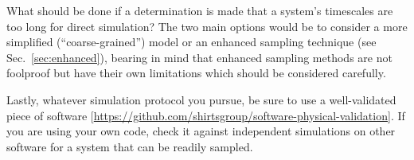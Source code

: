 What should be done if a determination is made that a system's timescales are too long for direct simulation?
The two main options would be to consider a more simplified (``coarse-grained'') model \cite{Merchant2011,Kmiecik2016} or an enhanced sampling technique (see Sec.~\ref{sec:enhanced}), bearing in mind that enhanced sampling methods are not foolproof but have their own limitations which should be considered carefully.

Lastly, whatever simulation protocol you pursue, be sure to use a well-validated piece of software [\url{https://github.com/shirtsgroup/software-physical-validation}].
If you are using your own code, check it against independent simulations on other software for a system that can be readily sampled.

